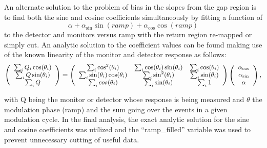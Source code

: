 An alternate solution to the problem of bias in the slopes from the gap region is to find both the sine and cosine coefficients simultaneously by fitting a function of
\[ 
\alpha+\alpha_{\sin}\sin(ramp)+\alpha_{\cos}\cos(ramp)
\]
to the detector and monitors versus ramp with the return region re-mapped or simply cut. An analytic solution to the coefficient values can be found making use of the known linearity of the monitor and detector response as follows:\\
\begin{equation*}\footnotesize
\left(\begin{array}{c}\sum_iQ_i\cos(\theta_i)\\\sum_iQ\sin(\theta_i)\\\sum_iQ\end{array}\right)=\left(\begin{array}{ccc}\sum_i\cos^2(\theta_i)&\sum_i\cos(\theta_i)\sin(\theta_i)&\sum_i\cos(\theta_i)\\\sum_i\sin(\theta_i)\cos(\theta_i)&\sum_i\sin^2(\theta_i)&\sum_i\sin(\theta_i)\\\sum_icos(\theta_i)&\sum_i\sin(\theta_i)&\sum_i1\end{array}\right)\left(\begin{array}{c}\alpha_{\cos}\\\alpha_{\sin}\\\alpha\end{array}\right),
\end{equation*}

with Q being the monitor or detector whose response is being measured and $\theta$ the modulation phase (ramp) and the sum going over the events in a given modulation cycle. In the final analysis, the exact analytic solution for the sine and cosine coefficients was utilized and the ``ramp\_filled'' variable was used to prevent unnecessary cutting of useful data. 

